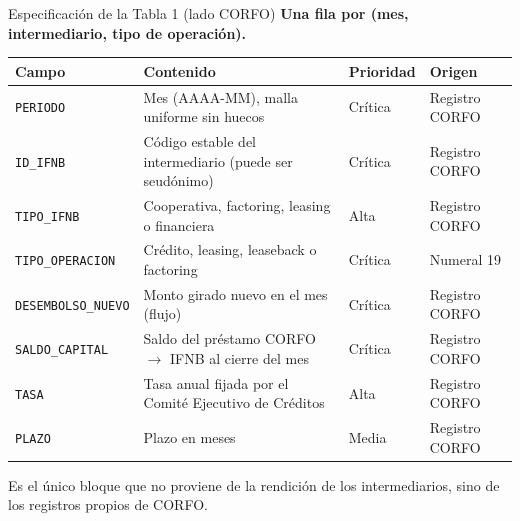 \documentclass[aspectratio=169]{beamer}
\begin{document}
\begin{frame}{Especificación de la Tabla 1 (lado CORFO)}
\textbf{Una fila por (mes, intermediario, tipo de operación).}
\begin{table}
\centering
\scriptsize
\begin{tabular}{@{}p{2.9cm}p{5.2cm}p{1.5cm}p{2.3cm}@{}}
\toprule
\textbf{Campo} & \textbf{Contenido} & \textbf{Prioridad} & \textbf{Origen} \\
\midrule
\texttt{PERIODO} & Mes (AAAA-MM), malla uniforme sin huecos & Crítica & Registro CORFO \\
\texttt{ID\_IFNB} & Código estable del intermediario (puede ser seudónimo) & Crítica & Registro CORFO \\
\texttt{TIPO\_IFNB} & Cooperativa, factoring, leasing o financiera & Alta & Registro CORFO \\
\texttt{TIPO\_OPERACION} & Crédito, leasing, leaseback o factoring & Crítica & Numeral 19 \\
\texttt{DESEMBOLSO\_NUEVO} & Monto girado nuevo en el mes (flujo) & Crítica & Registro CORFO \\
\texttt{SALDO\_CAPITAL} & Saldo del préstamo CORFO $\to$ IFNB al cierre del mes & Crítica & Registro CORFO \\
\texttt{TASA} & Tasa anual fijada por el Comité Ejecutivo de Créditos & Alta & Registro CORFO \\
\texttt{PLAZO} & Plazo en meses & Media & Registro CORFO \\
\bottomrule
\end{tabular}
\end{table}

\vspace{0.1cm}
\footnotesize Es el único bloque que no proviene de la rendición de los intermediarios, sino de los registros propios de CORFO.
\end{frame}
\end{document}
